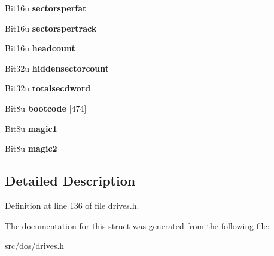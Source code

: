 \begin{DoxyCompactItemize}
\item 
\hypertarget{structbootstrap_a7abc121ee5cf0179d37f1cdb98391a41}{Bit16u {\bfseries sectorsperfat}}\label{structbootstrap_a7abc121ee5cf0179d37f1cdb98391a41}

\item 
\hypertarget{structbootstrap_a868404e778a74493156b30630a9b48e6}{Bit16u {\bfseries sectorspertrack}}\label{structbootstrap_a868404e778a74493156b30630a9b48e6}

\item 
\hypertarget{structbootstrap_a4f7f6491de73e87af208aab298c9136b}{Bit16u {\bfseries headcount}}\label{structbootstrap_a4f7f6491de73e87af208aab298c9136b}

\item 
\hypertarget{structbootstrap_abc6f5f20e1679a4f501abe1ef798b9f0}{Bit32u {\bfseries hiddensectorcount}}\label{structbootstrap_abc6f5f20e1679a4f501abe1ef798b9f0}

\item 
\hypertarget{structbootstrap_ad300f887cdb08ab96b6801d200917f06}{Bit32u {\bfseries totalsecdword}}\label{structbootstrap_ad300f887cdb08ab96b6801d200917f06}

\item 
\hypertarget{structbootstrap_a72cba09bab10bb5d38fd8f64eb1a7c75}{Bit8u {\bfseries bootcode} \mbox{[}474\mbox{]}}\label{structbootstrap_a72cba09bab10bb5d38fd8f64eb1a7c75}

\item 
\hypertarget{structbootstrap_a1811d90a55c9d108cc2c0d9d46193903}{Bit8u {\bfseries magic1}}\label{structbootstrap_a1811d90a55c9d108cc2c0d9d46193903}

\item 
\hypertarget{structbootstrap_abdbe4c43e70a69b62efde13144ef8241}{Bit8u {\bfseries magic2}}\label{structbootstrap_abdbe4c43e70a69b62efde13144ef8241}

\end{DoxyCompactItemize}


\subsection{Detailed Description}


Definition at line 136 of file drives.\-h.



The documentation for this struct was generated from the following file\-:\begin{DoxyCompactItemize}
\item 
src/dos/drives.\-h\end{DoxyCompactItemize}
